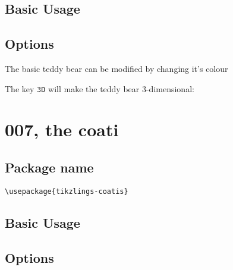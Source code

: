 \documentclass[parskip=half]{scrartcl}
\begin{document}
\subsection{Basic Usage}

\begin{tcblisting}{}
\bear
\end{tcblisting}

\subsection{Options}

The basic teddy bear can be modified by changing it's colour

\begin{tcblisting}{}
\bear[body=SteelBlue]
\end{tcblisting}

The key \lstinline|3D| will make the teddy bear 3-dimensional:

\begin{tcblisting}{}
\bear[3D]
\end{tcblisting}


\clearpage
\section[Coati]{007, the coati}

\subsection{Package name}

\begin{tcolorbox}[lower separated=false, lefthand width=.8\linewidth]
\vspace*{0.5cm}
\lstinline|\usepackage{tikzlings-coatis}|
\vspace*{0.5cm}
\end{tcolorbox}

\subsection{Basic Usage}

\begin{tcblisting}{}
\coati
\end{tcblisting}

\subsection{Options}
\end{document}
